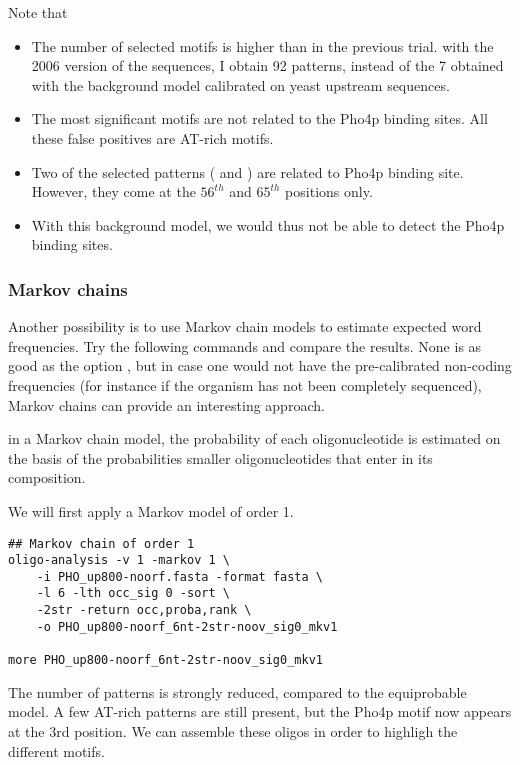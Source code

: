 Note that
\begin{itemize} 
\item The number of selected motifs is higher than in the previous
  trial. with the 2006 version of the sequences, I obtain 92 patterns,
  instead of the 7 obtained with the background model calibrated on
  yeast upstream sequences.
\item The most significant motifs are not related to the Pho4p binding
  sites. All these false positives are AT-rich motifs.
\item Two of the selected patterns ( and ) are
  related to Pho4p binding site. However, they come at the $56^{th}$ and
  $65^{th}$ positions only. 
\item With this background model, we would thus not be able to detect
  the Pho4p binding sites.
\end{itemize}

\subsubsection{Markov chains}

Another possibility is to use Markov chain models to estimate expected
word frequencies. Try the following commands and compare the
results. None is as good as the option ,
but in case one would not have the pre-calibrated non-coding
frequencies (for instance if the organism has not been completely
sequenced), Markov chains can provide an interesting approach. 

in a Markov chain model, the probability of each oligonucleotide is
estimated on the basis of the probabilities smaller oligonucleotides
that enter in its composition.

We will first apply a Markov model of order 1. 

{\color{Blue} \begin{footnotesize} 
\begin{verbatim}
## Markov chain of order 1
oligo-analysis -v 1 -markov 1 \
    -i PHO_up800-noorf.fasta -format fasta \
    -l 6 -lth occ_sig 0 -sort \
    -2str -return occ,proba,rank \
    -o PHO_up800-noorf_6nt-2str-noov_sig0_mkv1

more PHO_up800-noorf_6nt-2str-noov_sig0_mkv1

\end{verbatim} \end{footnotesize}
}

The number of patterns is strongly reduced, compared to the
equiprobable model. A few AT-rich patterns are still present, but the
Pho4p motif now appears at the 3rd position. We can assemble these
oligos in order to highligh the different motifs.

